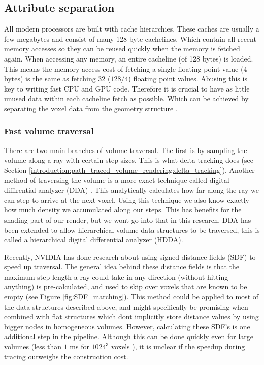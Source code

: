 \clearpage\subsection{Attribute separation} \label{introduction:attribute_separation}
All modern processors are built with cache hierarchies. These caches are usually a few megabytes and consist of many 128 byte cachelines. Which contain all recent memory accesses so they can be reused quickly when the memory is fetched again. When accessing any memory, an entire cacheline (of 128 bytes) is loaded. This means the memory access cost of fetching a single floating point value ($4$ bytes) is the same as fetching 32 ($128/4$) floating point values. Abusing this is key to writing fast CPU and GPU code. Therefore it is crucial to have as little unused data within each cacheline fetch as possible. Which can be achieved by separating the voxel data from the geometry structure \cite{dado2016geometry}.
\subsubsection{Fast volume traversal} \label{introduction:attribute_separation:fast_volume_traversal}
There are two main branches of volume traversal. The first is by sampling the volume along a ray with certain step sizes. This is what delta tracking does (see Section \ref{introduction:path_traced_volume_rendering:delta_tracking}). Another method of traversing the volume is a more exact technique called digital diffirential analyzer (DDA) \cite{amanatides1987fast}. This analytically calculates how far along the ray we can step to arrive at the next voxel. Using this technique we also know exactly how much density we accumulated along our steps. This has benefits for the shading part of our render, but we wont go into that in this research. DDA has been extended to allow hierarchical volume data structures to be traversed, this is called a hierarchical digital differential analyzer (HDDA)\cite{laine2010efficient}.


Recently, NVIDIA has done research about using signed distance fields (SDF) to speed up traversal\cite{soderlund2022ray}. The general idea behind these distance fields is that the maximum step length a ray could take in any direction (without hitting anything) is pre-calculated, and used to skip over voxels that are known to be empty (see Figure \ref{fig:SDF_marching}). This method could be applied to most of the data structures described above, and might specifically be promising when combined with flat structures which dont implicitly store distance values by using bigger nodes in homogeneous volumes. However, calculating these SDF's is one additional step in the pipeline. Although this can be done quickly even for large volumes (less than $1$ ms for $1024^3$ voxels \cite{cao2010parallel}), it is unclear if the speedup during tracing outweighs the construction cost.
